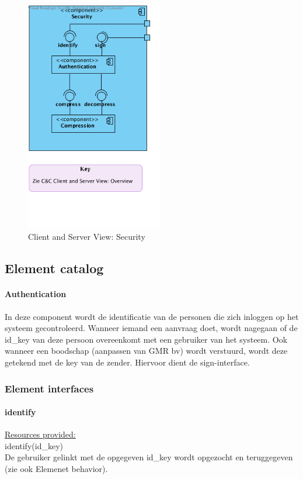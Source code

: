 \documentclass[a4paper,10pt]{article}
\begin{document}
\begin{figure}[!h]
  \includegraphics[width=60mm]{../images/ClientServer_Security.png}
  \caption{Client and Server View: Security}
\end{figure}

\subsection{Element catalog}

\paragraph{Authentication}
In deze component wordt de identificatie van de personen die zich inloggen op het systeem gecontroleerd. Wanneer iemand een aanvraag doet, wordt nagegaan of de id\_key van deze persoon overeenkomt met een gebruiker van het systeem. Ook wanneer een boodschap (aanpassen van GMR bv) wordt verstuurd, wordt deze getekend met de key van de zender. Hiervoor dient de sign-interface.  

\subsubsection{Element interfaces}
\paragraph{identify}

\underline{Resources provided:}\\
identify(id\_key)\\
De gebruiker gelinkt met de opgegeven id\_key wordt opgezocht en teruggegeven (zie ook Elemenet behavior).
\end{document}
